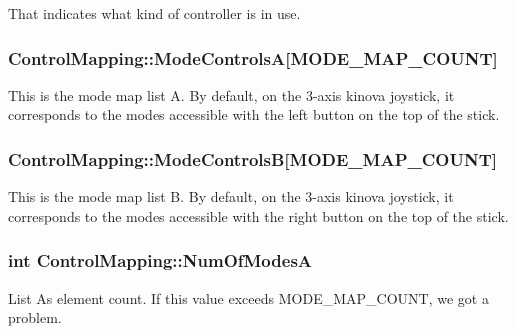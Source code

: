 That indicates what kind of controller is in use. 

\subsubsection[{\texorpdfstring{Mode\+ControlsA}{ModeControlsA}}]{ Control\+Mapping\+::\+Mode\+ControlsA\mbox{[}{\bf M\+O\+D\+E\+\_\+\+M\+A\+P\+\_\+\+C\+O\+U\+NT}\mbox{]}}\hypertarget{struct_control_mapping_acb57ae41b95f7beef041aa311c040a98}{}\label{struct_control_mapping_acb57ae41b95f7beef041aa311c040a98}


This is the mode map list A. By default, on the 3-\/axis kinova joystick, it corresponds to the modes accessible with the left button on the top of the stick. 

\subsubsection[{\texorpdfstring{Mode\+ControlsB}{ModeControlsB}}]{ Control\+Mapping\+::\+Mode\+ControlsB\mbox{[}{\bf M\+O\+D\+E\+\_\+\+M\+A\+P\+\_\+\+C\+O\+U\+NT}\mbox{]}}\hypertarget{struct_control_mapping_a068cd90e7e56554639f2a24d96f6e925}{}\label{struct_control_mapping_a068cd90e7e56554639f2a24d96f6e925}


This is the mode map list B. By default, on the 3-\/axis kinova joystick, it corresponds to the modes accessible with the right button on the top of the stick. 

\subsubsection[{\texorpdfstring{Num\+Of\+ModesA}{NumOfModesA}}]{\setlength{\rightskip}{0pt plus 5cm}int Control\+Mapping\+::\+Num\+Of\+ModesA}\hypertarget{struct_control_mapping_ab82579c661e09b8a7d4e5bae10823b47}{}\label{struct_control_mapping_ab82579c661e09b8a7d4e5bae10823b47}


List A\textquotesingle{}s element count. If this value exceeds M\+O\+D\+E\+\_\+\+M\+A\+P\+\_\+\+C\+O\+U\+NT, we got a problem. 

